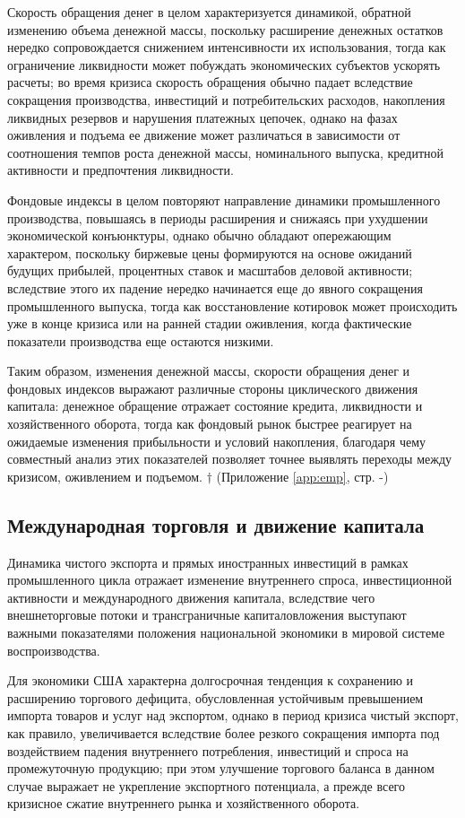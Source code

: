 Скорость обращения денег в целом характеризуется динамикой, обратной изменению объема денежной массы, поскольку расширение денежных остатков нередко сопровождается снижением интенсивности их использования, тогда как ограничение ликвидности может побуждать экономических субъектов ускорять расчеты; во время кризиса скорость обращения обычно падает вследствие сокращения производства, инвестиций и потребительских расходов, накопления ликвидных резервов и нарушения платежных цепочек, однако на фазах оживления и подъема ее движение может различаться в зависимости от соотношения темпов роста денежной массы, номинального выпуска, кредитной активности и предпочтения ликвидности.

Фондовые индексы в целом повторяют направление динамики промышленного производства, повышаясь в периоды расширения и снижаясь при ухудшении экономической конъюнктуры, однако обычно обладают опережающим характером, поскольку биржевые цены формируются на основе ожиданий будущих прибылей, процентных ставок и масштабов деловой активности; вследствие этого их падение нередко начинается еще до явного сокращения промышленного выпуска, тогда как восстановление котировок может происходить уже в конце кризиса или на ранней стадии оживления, когда фактические показатели производства еще остаются низкими.

Таким образом, изменения денежной массы, скорости обращения денег и фондовых индексов выражают различные стороны циклического движения капитала: денежное обращение отражает состояние кредита, ликвидности и хозяйственного оборота, тогда как фондовый рынок быстрее реагирует на ожидаемые изменения прибыльности и условий накопления, благодаря чему совместный анализ этих показателей позволяет точнее выявлять переходы между кризисом, оживлением и подъемом. $\dagger$ (Приложение \ref{app:emp}, стр. \pageref{fig:m2-velocity}-\pageref{fig:stock-market})

\subsection{Международная торговля и движение капитала}
Динамика чистого экспорта и прямых иностранных инвестиций в рамках промышленного цикла отражает изменение внутреннего спроса, инвестиционной активности и международного движения капитала, вследствие чего внешнеторговые потоки и трансграничные капиталовложения выступают важными показателями положения национальной экономики в мировой системе воспроизводства.

Для экономики США характерна долгосрочная тенденция к сохранению и расширению торгового дефицита, обусловленная устойчивым превышением импорта товаров и услуг над экспортом, однако в период кризиса чистый экспорт, как правило, увеличивается вследствие более резкого сокращения импорта под воздействием падения внутреннего потребления, инвестиций и спроса на промежуточную продукцию; при этом улучшение торгового баланса в данном случае выражает не укрепление экспортного потенциала, а прежде всего кризисное сжатие внутреннего рынка и хозяйственного оборота.

